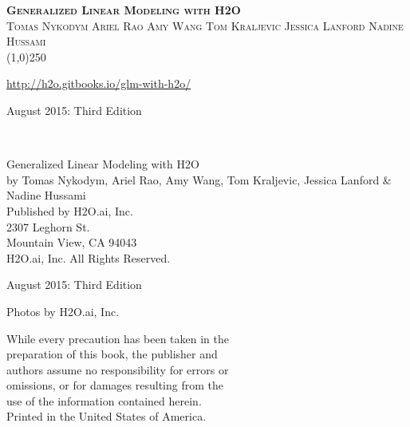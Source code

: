 









\thispagestyle{empty} %

\begin{center}
\textsc{\Large\bf{Generalized Linear Modeling with H2O}}
\\
\bigskip
\textsc{\small{Tomas Nykodym \hspace{20pt} Ariel Rao \hspace{20pt} Amy Wang \hspace{20pt} Tom Kraljevic \hspace{20pt} Jessica Lanford \hspace{20pt} Nadine Hussami}}
\\
\bigskip
\line(1,0){250}  %

{\url{http://h2o.gitbooks.io/glm-with-h2o/}}

\bigskip
August 2015: Third Edition 
\\%
\bigskip
\end{center}

{\raggedright\vfill\ 

Generalized Linear Modeling with H2O\\
  by Tomas Nykodym, Ariel Rao, Amy Wang, Tom Kraljevic, Jessica Lanford \& Nadine Hussami\ \\
\bigskip
  Published by H2O.ai, Inc. \\
2307 Leghorn St. \\
Mountain View, CA 94043\\
\bigskip
{} H2O.ai, Inc. All Rights Reserved. 
\bigskip

August 2015: Third Edition
\bigskip

Photos by \textcopyright H2O.ai, Inc.
\bigskip

While every precaution has been taken in the\\
preparation of this book, the publisher and\\
authors assume no responsibility for errors or\\
omissions, or for damages resulting from the\\
use of the information contained herein.\\
\bigskip
Printed in the United States of America. 
}

